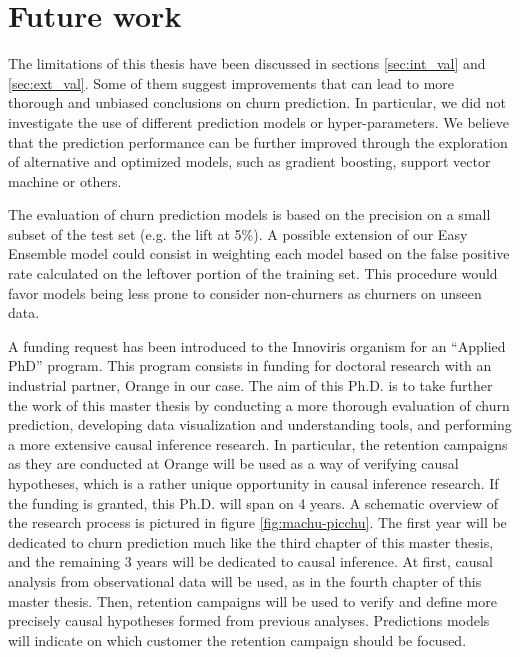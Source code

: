 \section{Future work}

The limitations of this thesis have been discussed in sections
\ref{sec:int_val} and  \ref{sec:ext_val}. Some of them suggest improvements that
can lead to more thorough and unbiased conclusions on churn prediction. In
particular, we did not investigate the use of different prediction models or
hyper-parameters. We believe that the prediction performance can be further
improved through the exploration of alternative and optimized models, such as
gradient boosting, support vector machine or others.

The evaluation of churn prediction models is based on the precision on a small
subset of the test set (e.g. the lift at 5\%). A possible extension of our Easy
Ensemble model could consist in weighting each model based on the false positive
rate calculated on the leftover portion of the training set. This procedure
would favor models being less prone to consider non-churners as churners on
unseen data.

A funding request has been introduced to the Innoviris organism for an ``Applied
PhD'' program. This program consists in funding for doctoral research with an
industrial partner, Orange in our case. The aim of this Ph.D. is to take further
the work of this master thesis by conducting a more thorough evaluation of churn
prediction, developing data visualization and understanding tools, and
performing a more extensive causal inference research. In particular, the
retention campaigns as they are conducted at Orange will be used as a way of
verifying causal hypotheses, which is a rather unique opportunity in causal
inference research. If the funding is granted, this Ph.D. will span on 4 years.
A schematic overview of the research process is pictured in figure
\ref{fig:machu-picchu}. The first year will be dedicated to churn prediction
much like the third chapter of this master thesis, and the remaining 3 years
will be dedicated to causal inference. At first, causal analysis from
observational data will be used, as in the fourth chapter of this master thesis.
Then, retention campaigns will be used to verify and define more precisely
causal hypotheses formed from previous analyses. Predictions models will
indicate on which customer the retention campaign should be focused.

